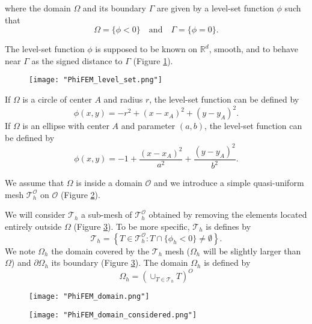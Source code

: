 where the domain $\Omega$ and its boundary $\Gamma$ are given by a level-set function $\phi$ such that
\begin{equation*}
	\Omega=\{\phi < 0\} \quad \text{and} \quad \Gamma=\{\phi = 0\}.
\end{equation*}

The level-set function $\phi$ is supposed to be known on $\mathbb{R}^d$, smooth, and to behave near $\Gamma$ as the signed distance to $\Gamma$ (Figure \ref{space1}). 

\begin{figure}[H]
	\centering
	\texttt{[image: "PhiFEM\_level\_set.png"]}
	\label{space1}
\end{figure}

\begin{Example}
	If $\Omega$ is a circle of center $A$ and radius $r$, the level-set function can be defined by
	\begin{equation*}
		\phi(x,y)=-r^2+(x-x_A)^2+(y-y_A)^2.
	\end{equation*}
	If $\Omega$ is an ellipse with center $A$ and parameter $(a,b)$, the level-set function can be defined by
	\begin{equation*}
		\phi(x,y)=-1+\frac{(x-x_A)^2}{a^2}+\frac{(y-y_A)^2}{b^2}.
	\end{equation*}
\end{Example}

We assume that $\Omega$ is inside a domain $\mathcal{O}$ and we introduce a simple quasi-uniform mesh $\mathcal{T}_h^\mathcal{O}$ on $\mathcal{O}$ (Figure \ref{space2}).
 
We will consider $\mathcal{T}_h$ a sub-mesh of $\mathcal{T}_h^\mathcal{O}$ obtained by removing the elements located entirely outside $\Omega$ (Figure \ref{space3}). To be more specific, $\mathcal{T}_h$ is defines by
\begin{equation*}
	\mathcal{T}_h=\left\{T\in \mathcal{T}_h^\mathcal{O}:T\cap\{\phi_h<0\}\ne\emptyset\right\}.
\end{equation*}
We note $\Omega_h$ the domain covered by the $\mathcal{T}_h$ mesh ($\Omega_h$ will be slightly larger than $\Omega$) and $\partial\Omega_h$ its boundary (Figure \ref{space3}). The domain $\Omega_h$ is defined by
\begin{equation*}
	\Omega_h=\left(\cup_{T\in\mathcal{T}_h}T\right)^O
\end{equation*}

\begin{minipage}{0.52\linewidth}
	\begin{figure}[H]
		\centering
		\texttt{[image: "PhiFEM\_domain.png"]}
		\label{space2}
	\end{figure}
\end{minipage} \;
\begin{minipage}{0.44\linewidth}
	\begin{figure}[H]
		\centering
		\texttt{[image: "PhiFEM\_domain\_considered.png"]}
		\label{space3}
	\end{figure}
\end{minipage}


